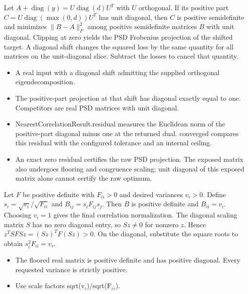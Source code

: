 \expandafter\def\csname statadic@statement@STATADIC-PSD-004\endcsname{Let $A+\operatorname{diag}(y)=U\operatorname{diag}(d)U^T$ with $U$
  orthogonal. If its positive part $C=U\operatorname{diag}(\max(0,d))U^T$
  has unit diagonal, then $C$ is positive semidefinite and minimizes
  $\|B-A\|_F^2$ among positive semidefinite matrices $B$ with unit diagonal.}
\expandafter\def\csname statadic@proof@STATADIC-PSD-004\endcsname{Clipping at zero yields the PSD Frobenius projection of the shifted
  target. A diagonal shift changes the squared loss by the same quantity for all
  matrices on the unit-diagonal slice. Subtract the losses to cancel that quantity.}
\expandafter\def\csname statadic@assumptions@STATADIC-PSD-004\endcsname{\begin{itemize}
\item A real input with a diagonal shift admitting the supplied orthogonal eigendecomposition.
\item The positive-part projection at that shift has diagonal exactly equal to one. Competitors are real PSD matrices with unit diagonal.
\end{itemize}}
\expandafter\def\csname statadic@diagnostics@STATADIC-PSD-004\endcsname{\begin{itemize}
\item NearestCorrelationResult.residual measures the Euclidean norm of the positive-part diagonal minus one at the returned dual. converged compares this residual with the configured tolerance and an internal ceiling.
\item An exact zero residual certifies the raw PSD projection. The exposed matrix also undergoes flooring and congruence scaling; unit diagonal of this exposed matrix alone cannot certify the raw optimum.
\end{itemize}}
\expandafter\def\csname statadic@statement@STATADIC-PSD-005\endcsname{Let $F$ be positive definite with $F_{ii}>0$ and desired variances
  $v_i>0$. Define $s_i=\sqrt{v_i}/\sqrt{F_{ii}}$ and $B_{ij}=s_iF_{ij}s_j$.
  Then $B$ is positive definite and $B_{ii}=v_i$. Choosing $v_i=1$ gives the
  final correlation normalization.}
\expandafter\def\csname statadic@proof@STATADIC-PSD-005\endcsname{The diagonal scaling matrix $S$ has no zero diagonal entry, so
  $Sz\ne0$ for nonzero $z$. Hence $z^T SFSz=(Sz)^TF(Sz)>0$. On the diagonal,
  substitute the square roots to obtain $s_i^2F_{ii}=v_i$.}
\expandafter\def\csname statadic@assumptions@STATADIC-PSD-005\endcsname{\begin{itemize}
\item The floored real matrix is positive definite and has positive diagonal. Every requested variance is strictly positive.
\item Use scale factors sqrt(v\ensuremath{{}_i})/sqrt(F\ensuremath{{}_i}\ensuremath{{}_i}).
\end{itemize}}
